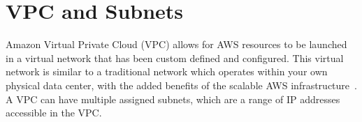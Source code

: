 \chapter{VPC and Subnets}\label{ch:vpc_subnets}

Amazon Virtual Private Cloud (VPC) allows for AWS resources to be launched in a virtual network that has been custom
defined and configured.
This virtual network is similar to a traditional network which operates within your own physical data center, with the
added benefits of the scalable AWS infrastructure~\parencite{amazon2022what}.
A VPC can have multiple assigned subnets, which are a range of IP addresses accessible in the VPC\@.


